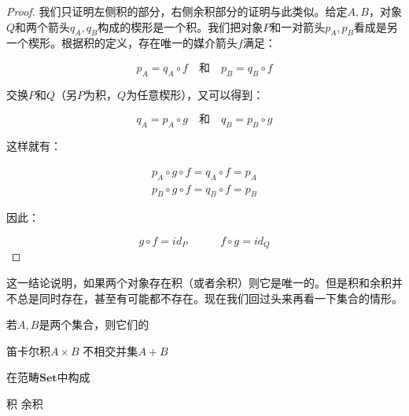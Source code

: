 \documentclass{article}
\begin{document}
\begin{proof}
我们只证明左侧积的部分，右侧余积部分的证明与此类似。给定$A, B$，对象$Q$和两个箭头$q_A, q_B$构成的楔形是一个积。我们把对象$P$和一对箭头$p_A, p_B$看成是另一个楔形。根据积的定义，存在唯一的媒介箭头$f$满足：

\[
p_A = q_A \circ f \quad \text{和} \quad p_B = q_B \circ f
\]

交换$P$和$Q$（另$P$为积，$Q$为任意楔形），又可以得到：

\[
q_A = p_A \circ g \quad \text{和} \quad q_B = p_B \circ g
\]

这样就有：

\[
\begin{array}{l}
p_A \circ g \circ f = q_A \circ f = p_A \\
p_B \circ g \circ f = q_B \circ f = p_B
\end{array}
\]

因此：

\[
g \circ f = id_P \quad \quad \quad f \circ g = id_Q
\]

\end{proof}

这一结论说明，如果两个对象存在积（或者余积）则它是唯一的。但是积和余积并不总是同时存在，甚至有可能都不存在。现在我们回过头来再看一下集合的情形。

\begin{lemma}
若$A, B$是两个集合，则它们的

\begin{center}
笛卡尔积$A \times B$ \quad \quad \quad 不相交并集$A + B$
\end{center}

在范畴$\pmb{Set}$中构成

\begin{center}
积 \quad \quad \quad 余积
\end{center}
 \end{lemma}
\end{document}

